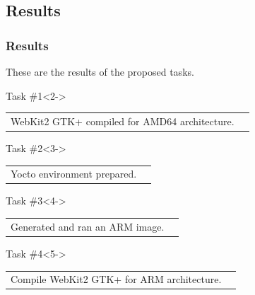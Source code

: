 \documentclass[slidestop,compress,mathserif]{beamer}
\newcommand{\cmark}{\ding{51}}
\newcommand{\xmark}{\ding{55}}
\begin{document}
\subsection{Results}
\begin{frame}
  \frametitle{Results}

  These are the results of the proposed tasks.

  \begin{block}{Task \#1}<2->
    \begin{tabularx}{\textwidth}{Xr}
      WebKit2 GTK+ compiled for AMD64 architecture. & \cmark \\
    \end{tabularx}
  \end{block}

  \begin{block}{Task \#2}<3->
    \begin{tabularx}{\textwidth}{Xr}
      Yocto environment prepared. & \cmark \\
    \end{tabularx}
  \end{block}

  \begin{block}{Task \#3}<4->
    \begin{tabularx}{\textwidth}{Xr}
      Generated and ran an ARM image. & \cmark \\
    \end{tabularx}
  \end{block}

  \begin{alertblock}{Task \#4}<5->
    \begin{tabularx}{\textwidth}{Xr}
      Compile WebKit2 GTK+ for ARM architecture. & \xmark \\
    \end{tabularx}
  \end{alertblock}
\end{frame}
\end{document}
